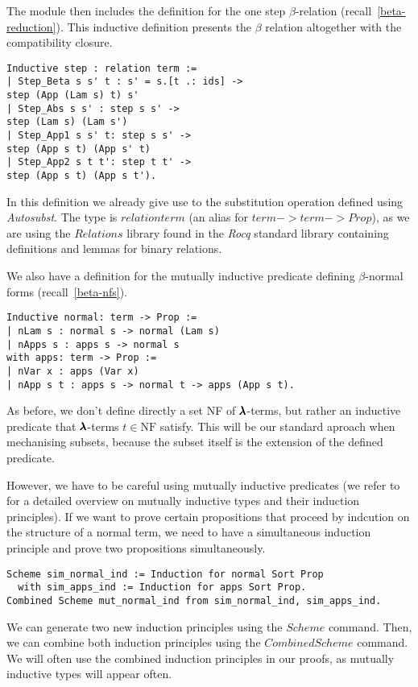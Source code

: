 The module then includes the definition for the one step $\beta$-relation (recall~\cref{beta-reduction}).
This inductive definition presents the $\beta$ relation altogether with the compatibility closure.
\begin{lstlisting}[language=Coq]
Inductive step : relation term :=
| Step_Beta s s' t : s' = s.[t .: ids] ->
step (App (Lam s) t) s'
| Step_Abs s s' : step s s' ->
step (Lam s) (Lam s')
| Step_App1 s s' t: step s s' ->
step (App s t) (App s' t)
| Step_App2 s t t': step t t' ->
step (App s t) (App s t').
\end{lstlisting}

In this definition we already give use to the substitution operation defined using \textit{Autosubst}.
The type is \lst$relation term$ (an alias for \lst$term->term->Prop$), as we are using the \lst$Relations$ library found in the \textit{Rocq} standard library containing definitions and lemmas for binary relations.

We also have a definition for the mutually inductive predicate defining $\beta$-normal forms (recall~\cref{beta-nfs}).
\begin{lstlisting}[language=Coq]
Inductive normal: term -> Prop :=
| nLam s : normal s -> normal (Lam s)
| nApps s : apps s -> normal s  
with apps: term -> Prop :=
| nVar x : apps (Var x)
| nApp s t : apps s -> normal t -> apps (App s t).
\end{lstlisting}

As before, we don't define directly a set NF of $\pmb{\lambda}$-terms, but rather an inductive predicate that $\pmb{\lambda}$-terms $t \in \text{NF}$ satisfy.
This will be our standard aproach when mechanising subsets, because the subset itself is the extension of the defined predicate.

However, we have to be careful using mutually inductive predicates (we refer to~\cite[Chapter~14.1]{CoqArt} for a detailed overview on mutually inductive types and their induction principles).
If we want to prove certain propositions that proceed by indcution on the structure of a normal term, we need to have a simultaneous induction principle and prove two propositions simultaneously.
\begin{lstlisting}[language=Coq]
Scheme sim_normal_ind := Induction for normal Sort Prop
  with sim_apps_ind := Induction for apps Sort Prop.
Combined Scheme mut_normal_ind from sim_normal_ind, sim_apps_ind.
\end{lstlisting}

We can generate two new induction principles using the \lst$Scheme$ command.
Then, we can combine both induction principles using the \lst$Combined Scheme$ command.
We will often use the combined induction principles in our proofs, as mutually inductive types will appear often. 

